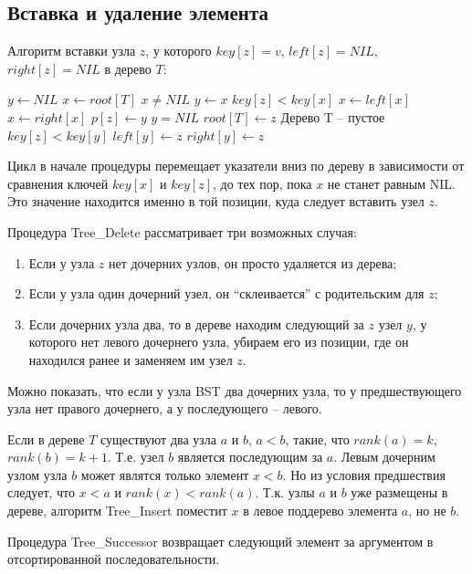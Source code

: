 \documentclass[11pt]{article}
\begin{document}
\subsection{Вставка и удаление элемента}
Алгоритм вставки узла $z$, у которого $key[z] = v$, $left[z] = NIL$,
$right[z] = NIL$ в дерево $T$:
\begin{codebox}
\li $y \gets NIL$
\li $x \gets root[T]$
\li \While $x \neq NIL$
\li   \Do $y \gets x$
\li     \If $key[z] < key[x]$
\li       \Then $x \gets left[x]$
\li       \Else $x \gets right[x]$
  \End
\End
\li $p[z] \gets y$
\li \If $y = NIL$
\li   \Then $root[T] \gets z$ \Comment Дерево T -- пустое
\li   \Else \If $key[z] < key[y]$
\li       \Then $left[y] \gets z$
\li       \Else $right[y] \gets z$
  \End
\End
\end{codebox}

Цикл в начале процедуры перемещает указатели вниз по дереву в зависимости от
сравнения ключей $key[x]$ и $key[z]$, до тех пор, пока $x$ не станет равным NIL.
Это значение находится именно в той позиции, куда следует вставить узел $z$.

Процедура Tree\_Delete рассматривает три возможных случая:
\begin{enumerate}
\item Если у узла $z$ нет дочерних узлов, он просто удаляется из дерева;
\item Если у узла один дочерний узел, он ``склеивается'' с родительским для $z$;
\item Если дочерних узла два, то в дереве находим следующий за $z$ узел $y$, у
  которого нет левого дочернего узла, убираем его из позиции, где он находился
  ранее и заменяем им узел $z$.
\end{enumerate}

Можно показать, что если у узла BST два дочерних узла, то у предшествующего
узла нет правого дочернего, а у последующего -- левого.

Если в дереве $T$ существуют два узла $a$ и $b$, $a < b$, такие, что
$rank(a) = k$, $rank(b) = k+1$. Т.е. узел $b$ является последующим за $a$.
Левым дочерним узлом узла $b$ может являтся только элемент $x < b$. Но из
условия предшествия следует, что $x < a$ и $rank(x) < rank(a)$. Т.к. узлы
$a$ и $b$ уже размещены в дереве, алгоритм Tree\_Insert поместит $x$ в
левое поддерево элемента $a$, но не $b$.

Процедура Tree\_Successor возвращает следующий элемент за аргументом в
отсортированной последовательности.
\end{document}
